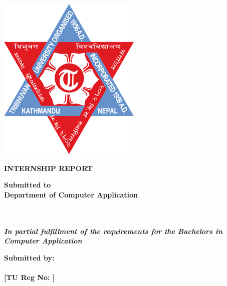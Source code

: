 \begin{titlepage}
    \centering
    {\fontsize{16}{19}\bfseries {}} \\
    {\fontsize{16}{19}\bfseries {}} \\

    \vspace{1.5cm}
    \includegraphics[scale=0.3]{contents/frontmatter/images/tu-logo.png} \\ 
    \vspace{1.5cm}

    {\fontsize{16}{19}\bfseries 
       \ProjectTitleCaps
     }\par

    {\fontsize{14}{17}\bfseries INTERNSHIP REPORT} \\

    \vspace{2cm}

    {\fontsize{14}{17}\bfseries Submitted to} \\
    {\fontsize{14}{17}\bfseries Department of Computer Application} \\
    {\fontsize{14}{17}\bfseries {}} \\
    {\fontsize{14}{17}\bfseries {}} \\

    \vspace{2cm}

    {\fontsize{14}{14}\bfseries \textit{In partial fulfillment of the requirements for the Bachelors in Computer Application}} \\

    \vspace{2cm}

    {\fontsize{14}{17}\bfseries Submitted by:} \\
    {\fontsize{14}{17}\bfseries {}} \\
    {\fontsize{14}{17}\bfseries [TU Reg No: ]} \\

    \vfill
    {\fontsize{14}{17}\bfseries {}} 
\end{titlepage}

